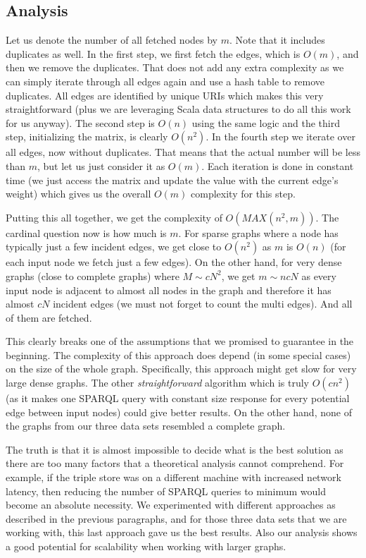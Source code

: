 \subsection{Analysis}

Let us denote the number of all fetched nodes by $m$. Note that it includes duplicates as well. In the first step, we first fetch the edges, which is $O(m)$, and then we remove the duplicates. That does not add any extra complexity as we can simply iterate through all edges again and use a hash table to remove duplicates. All edges are identified by unique URIs which makes this very straightforward (plus we are leveraging Scala data structures to do all this work for us anyway). The second step is $O(n)$ using the same logic and the third step, initializing the matrix, is clearly $O(n^2)$. In the fourth step we iterate over all edges, now without duplicates. That means that the actual number will be less than $m$, but let us just consider it as $O(m)$. Each iteration is done in constant time (we just access the matrix and update the value with the current edge’s weight) which gives us the overall $O(m)$ complexity for this step.

Putting this all together, we get the complexity of $O(MAX(n^2, m))$. The cardinal question now is how much is $m$. For sparse graphs where a node has typically just a few incident edges, we get close to $O(n^2)$ as $m$ is $O(n)$ (for each input node we fetch just a few edges). On the other hand, for very dense graphs (close to complete graphs) where $M \sim cN^2$, we get $m \sim ncN$ as every input node is adjacent to almost all nodes in the graph and therefore it has almost $cN$ incident edges (we must not forget to count the multi edges). And all of them are fetched.

This clearly breaks one of the assumptions that we promised to guarantee in the beginning. The complexity of this approach does depend (in some special cases) on the size of the whole graph. Specifically, this approach might get slow for very large dense graphs. The other \emph{straightforward} algorithm which is truly $O(cn^2)$ (as it makes one SPARQL query with constant size response for every potential edge between input nodes) could give better results. On the other hand, none of the graphs from our three data sets resembled a complete graph.

The truth is that it is almost impossible to decide what is the best solution as there are too many factors that a theoretical analysis cannot comprehend. For example, if the triple store was on a different machine with increased network latency, then reducing the number of SPARQL queries to minimum would become an absolute necessity. We experimented with different approaches as described in the previous paragraphs, and for those three data sets that we are working with, this last approach gave us the best results. Also our analysis shows a good potential for scalability when working with larger graphs.

